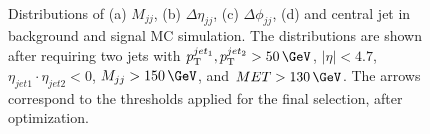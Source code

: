 \begin{figure}[!htb]
\centering
{}\qquad
{}\\
\qquad
{} 
\caption{Distributions of (a) $M_{jj}$, (b) $\Delta\eta_{jj}$, (c) $\Delta\phi_{jj}$, (d) and central jet \pt in background and signal MC simulation. The distributions are shown after requiring two jets with $\pt^{jet_1},\pt^{jet_2} > 50\,\GeV$, $|\eta| < 4.7$, $\eta_{jet1} \cdot \eta_{jet2} < 0$, $M_{jj}>150\,\GeV$, and $MET > 130\,\GeV$. The arrows correspond to the thresholds applied for the final selection, after optimization. \cite{ARTICLE:CMSVBFHiggsToInvAndZHCombination}}
\label{FIGURE:PromptDataAnalysis_EventSelection_KeyVariables}
\end{figure}

